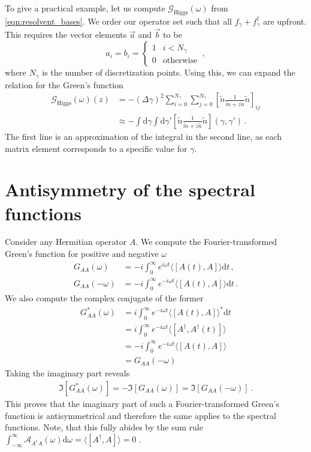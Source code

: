 \documentclass[
    reprint, 
    aps,
    preprintnumbers,
    twocolumn,
    prb,
    superscriptaddress
]{revtex4-2}
\newcommand{\dgamma}{\mathrm{d}\gamma}
\newcommand{\greens}[1]{\mathcal{G}_\text{#1} (\omega)}
\begin{document}
To give a practical example, let us compute $\greens{Higgs}$ from \eqref{eqn:resolvent_bases}.
We order our operator set such that all $f_\gamma + f_\gamma^{\dagger}$ are upfront. 
This requires the vector elements $\vec{a}$ and $\vec{b}$ to be
\begin{equation}
    a_i = b_i = \begin{cases}
        1 & i < N_\gamma \\
        0 & \text{otherwise}
    \end{cases}\,,
\end{equation}
where $N_\gamma$ is the number of discretization points.
Using this, we can expand the relation for the Green's function
\begin{align}
    \greens{Higgs} (z) &= -(\Delta \gamma)^2 \sum_{i=0}^{N_\gamma} \sum_{j=0}^{N_\gamma} \left[ \tilde{n} \frac{1}{\tilde{m} + z \tilde{n}} \tilde{n} \right]_{ij} \nonumber \\
        &\approx - \int \dgamma \int \dgamma' \left[ \tilde{n} \frac{1}{\tilde{m} + z \tilde{n}} \tilde{n} \right](\gamma, \gamma')\,.
\end{align}
The first line is an approximation of the integral in the second line, as each matrix element corresponds to a specific value for $\gamma$.

\section{Antisymmetry of the spectral functions}
\label{sec:antisymmetry_spectral}

Consider any Hermitian operator $A$. 
We compute the Fourier-transformed Green's function for positive and negative $\omega$
\begin{align}
    G_{AA}(\omega) &= -i \int_0^\infty e^{i \omega t} \langle [A(t), A] \rangle \mathrm{d}t\,, \nonumber \\
    G_{AA}(- \omega) &= -i \int_0^\infty e^{-i \omega t} \langle [A(t), A] \rangle \mathrm{d}t\,.
\end{align}
We also compute the complex conjugate of the former
\begin{align}
    G_{AA}^* (\omega) &= i \int_0^\infty e^{-i \omega t} \langle [A(t), A] \rangle^* \mathrm{d}t \nonumber \\
        &= i \int_0^\infty e^{-i \omega t} \langle [A^\dagger, A^\dagger(t)] \rangle \\
        &= -i \int_0^\infty e^{-i \omega t} \langle [A(t), A] \rangle \\
        &= G_{AA}(- \omega)
\end{align}
Taking the imaginary part reveals
\begin{align}
    \Im [ G_{AA}^* (\omega) ] = - \Im [G_{AA} (\omega) ] = \Im [G_{AA} (-\omega)]\,.
\end{align}
This proves that the imaginary part of such a Fourier-transformed Green's function is antisymmetrical and therefore the same applies to the spectral functions.
Note, that this fully abides by the sum rule $\int_{-\infty}^\infty \mathcal{A}_{A^\dagger A} (\omega) \mathrm{d}\omega = \langle [A^\dagger, A] \rangle = 0$ \cite{rickayzen80}.




%
		
\end{document}
